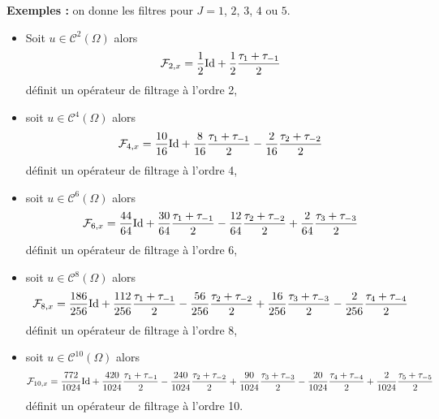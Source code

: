 \textbf{Exemples : } on donne les filtres pour $J=1$, $2$, $3$, $4$ ou $5$. 
\begin{itemize}
\item Soit $u \in \mathcal{C}^{2}(\Omega)$ alors
\begin{equation}
\mathcal{F}_{2,x} = \dfrac{1}{2} \text{Id} + \dfrac{1}{2} \dfrac{\tau_1 + \tau_{-1}}{2}
\end{equation}
définit un opérateur de filtrage à l'ordre 2,

\item soit $u \in \mathcal{C}^{4}(\Omega)$ alors
\begin{equation}
\mathcal{F}_{4,x} = \dfrac{10}{16} \text{Id} + \dfrac{8}{16} \dfrac{\tau_1 + \tau_{-1}}{2} - \dfrac{2}{16} \dfrac{\tau_2 + \tau_{-2}}{2}
\end{equation}
définit un opérateur de filtrage à l'ordre 4,

\item soit $u \in \mathcal{C}^{6}(\Omega)$ alors
\begin{equation}
\mathcal{F}_{6,x} = \dfrac{44}{64} \text{Id} + \dfrac{30}{64} \dfrac{\tau_1 + \tau_{-1}}{2} - \dfrac{12}{64} \dfrac{\tau_2 + \tau_{-2}}{2} + \dfrac{2}{64} \dfrac{\tau_3 + \tau_{-3}}{2}
\end{equation}
définit un opérateur de filtrage à l'ordre 6,

\item soit $u \in \mathcal{C}^{8}(\Omega)$ alors
\begin{equation}
\mathcal{F}_{8,x} = \dfrac{186}{256} \text{Id} + \dfrac{112}{256} \dfrac{\tau_1 + \tau_{-1}}{2} - \dfrac{56}{256} \dfrac{\tau_2 + \tau_{-2}}{2} + \dfrac{16}{256} \dfrac{\tau_3 + \tau_{-3}}{2} - \dfrac{2}{256} \dfrac{\tau_4 + \tau_{-4}}{2}
\end{equation}
définit un opérateur de filtrage à l'ordre 8,

\item soit $u \in \mathcal{C}^{10}(\Omega)$ alors
\begin{equation}
\mathcal{F}_{10,x} = \dfrac{772}{1024} \text{Id} + \dfrac{420}{1024} \dfrac{\tau_1 + \tau_{-1}}{2} - \dfrac{240}{1024} \dfrac{\tau_2 + \tau_{-2}}{2} + \dfrac{90}{1024} \dfrac{\tau_3 + \tau_{-3}}{2} - \dfrac{20}{1024} \dfrac{\tau_4 + \tau_{-4}}{2} + \dfrac{2}{1024} \dfrac{\tau_5 + \tau_{-5}}{2}
\end{equation}
définit un opérateur de filtrage à l'ordre 10.
\end{itemize}

